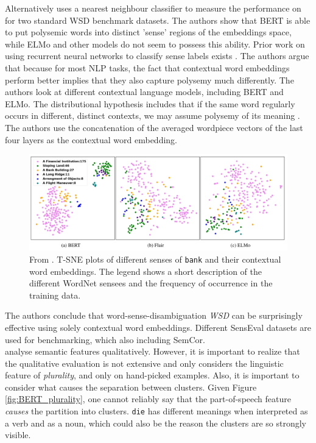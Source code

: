 \documentclass[a4paper,12pt,oneside,openright]{report}
\begin{document}
Alternatively \cite{wiedmann19} uses a nearest neighbour classifier to measure the performance on for two standard WSD benchmark datasets.
The authors show that BERT is able to put polysemic words into distinct 'sense' regions of the embeddings space, while ELMo and other models do not seem to possess this ability.
Prior work on using recurrent neural networks to classify sense labels exists \cite{kageback16}.
The authors argue that because for most NLP tasks, the fact that contextual word embeddings perform better implies that they also capture polysemy much differently.
The authors look at different contextual language models, including BERT and ELMo.
The distributional hypothesis includes that if the same word regularly occurs in different, distinct contexts, we may assume polysemy of its meaning \cite{miller91}.
The authors use the concatenation of the averaged wordpiece vectors of the last four layers as the contextual word embedding.

\begin{figure}[h]
	\center
  \includegraphics[width=0.9\linewidth]{./assets/relatedwork/wsd_bert.png}
  \caption{From \cite{wiedmann19}. T-SNE plots of different senses of \texttt{bank} and their contextual word embeddings. The legend shows a short description of the different WordNet sensees and the frequency of occurrence in the training data.
  }
  \label{fig:bert_wsd}
\end{figure}

The authors conclude that word-sense-disambiguation \textit{WSD} can be surprisingly effective using solely contextual word embeddings.
Different SensEval datasets are used for benchmarking, which also including SemCor. \\

\cite{coenen19} analyse semantic features qualitatively.
However, it is important to realize that the qualitative evaluation is not extensive and only considers the linguistic feature of \textit{plurality}, and only on hand-picked examples.
Also, it is important to consider what causes the separation between clusters.
Given Figure \ref{fig:BERT_plurality}, one cannot reliably say that the part-of-speech feature \textit{causes} the partition into clusters.
\texttt{die} has different meanings when interpreted as a verb and as a noun, which could also be the reason the clusters are so strongly visible.
\end{document}
